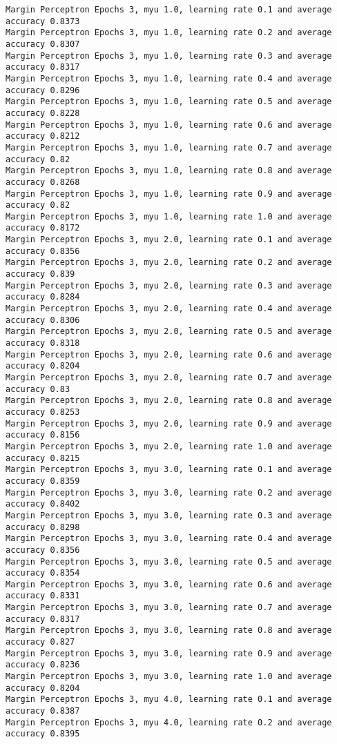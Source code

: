 \begin{Verbatim}[fontsize=\small]
Margin Perceptron Epochs 3, myu 1.0, learning rate 0.1 and average accuracy 0.8373
Margin Perceptron Epochs 3, myu 1.0, learning rate 0.2 and average accuracy 0.8307
Margin Perceptron Epochs 3, myu 1.0, learning rate 0.3 and average accuracy 0.8317
Margin Perceptron Epochs 3, myu 1.0, learning rate 0.4 and average accuracy 0.8296
Margin Perceptron Epochs 3, myu 1.0, learning rate 0.5 and average accuracy 0.8228
Margin Perceptron Epochs 3, myu 1.0, learning rate 0.6 and average accuracy 0.8212
Margin Perceptron Epochs 3, myu 1.0, learning rate 0.7 and average accuracy 0.82
Margin Perceptron Epochs 3, myu 1.0, learning rate 0.8 and average accuracy 0.8268
Margin Perceptron Epochs 3, myu 1.0, learning rate 0.9 and average accuracy 0.82
Margin Perceptron Epochs 3, myu 1.0, learning rate 1.0 and average accuracy 0.8172
Margin Perceptron Epochs 3, myu 2.0, learning rate 0.1 and average accuracy 0.8356
Margin Perceptron Epochs 3, myu 2.0, learning rate 0.2 and average accuracy 0.839
Margin Perceptron Epochs 3, myu 2.0, learning rate 0.3 and average accuracy 0.8284
Margin Perceptron Epochs 3, myu 2.0, learning rate 0.4 and average accuracy 0.8306
Margin Perceptron Epochs 3, myu 2.0, learning rate 0.5 and average accuracy 0.8318
Margin Perceptron Epochs 3, myu 2.0, learning rate 0.6 and average accuracy 0.8204
Margin Perceptron Epochs 3, myu 2.0, learning rate 0.7 and average accuracy 0.83
Margin Perceptron Epochs 3, myu 2.0, learning rate 0.8 and average accuracy 0.8253
Margin Perceptron Epochs 3, myu 2.0, learning rate 0.9 and average accuracy 0.8156
Margin Perceptron Epochs 3, myu 2.0, learning rate 1.0 and average accuracy 0.8215
Margin Perceptron Epochs 3, myu 3.0, learning rate 0.1 and average accuracy 0.8359
Margin Perceptron Epochs 3, myu 3.0, learning rate 0.2 and average accuracy 0.8402
Margin Perceptron Epochs 3, myu 3.0, learning rate 0.3 and average accuracy 0.8298
Margin Perceptron Epochs 3, myu 3.0, learning rate 0.4 and average accuracy 0.8356
Margin Perceptron Epochs 3, myu 3.0, learning rate 0.5 and average accuracy 0.8354
Margin Perceptron Epochs 3, myu 3.0, learning rate 0.6 and average accuracy 0.8331
Margin Perceptron Epochs 3, myu 3.0, learning rate 0.7 and average accuracy 0.8317
Margin Perceptron Epochs 3, myu 3.0, learning rate 0.8 and average accuracy 0.827
Margin Perceptron Epochs 3, myu 3.0, learning rate 0.9 and average accuracy 0.8236
Margin Perceptron Epochs 3, myu 3.0, learning rate 1.0 and average accuracy 0.8204
Margin Perceptron Epochs 3, myu 4.0, learning rate 0.1 and average accuracy 0.8387
Margin Perceptron Epochs 3, myu 4.0, learning rate 0.2 and average accuracy 0.8395

\end{Verbatim}

